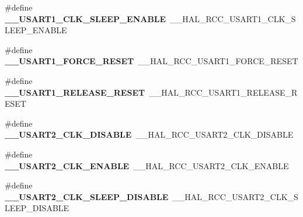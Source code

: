 \begin{DoxyCompactItemize}
\item 
\#define {\bfseries \+\_\+\+\_\+\+U\+S\+A\+R\+T1\+\_\+\+C\+L\+K\+\_\+\+S\+L\+E\+E\+P\+\_\+\+E\+N\+A\+B\+LE}~\+\_\+\+\_\+\+H\+A\+L\+\_\+\+R\+C\+C\+\_\+\+U\+S\+A\+R\+T1\+\_\+\+C\+L\+K\+\_\+\+S\+L\+E\+E\+P\+\_\+\+E\+N\+A\+B\+LE\hypertarget{group___h_a_l___r_c_c___aliased_ga6378b19a4a228da0e399b703b018f10c}{}\label{group___h_a_l___r_c_c___aliased_ga6378b19a4a228da0e399b703b018f10c}

\item 
\#define {\bfseries \+\_\+\+\_\+\+U\+S\+A\+R\+T1\+\_\+\+F\+O\+R\+C\+E\+\_\+\+R\+E\+S\+ET}~\+\_\+\+\_\+\+H\+A\+L\+\_\+\+R\+C\+C\+\_\+\+U\+S\+A\+R\+T1\+\_\+\+F\+O\+R\+C\+E\+\_\+\+R\+E\+S\+ET\hypertarget{group___h_a_l___r_c_c___aliased_gaf29da865725f4aa165fa9f551c40025e}{}\label{group___h_a_l___r_c_c___aliased_gaf29da865725f4aa165fa9f551c40025e}

\item 
\#define {\bfseries \+\_\+\+\_\+\+U\+S\+A\+R\+T1\+\_\+\+R\+E\+L\+E\+A\+S\+E\+\_\+\+R\+E\+S\+ET}~\+\_\+\+\_\+\+H\+A\+L\+\_\+\+R\+C\+C\+\_\+\+U\+S\+A\+R\+T1\+\_\+\+R\+E\+L\+E\+A\+S\+E\+\_\+\+R\+E\+S\+ET\hypertarget{group___h_a_l___r_c_c___aliased_ga705c0a674be8a0f70f013a31f7f2ee1c}{}\label{group___h_a_l___r_c_c___aliased_ga705c0a674be8a0f70f013a31f7f2ee1c}

\item 
\#define {\bfseries \+\_\+\+\_\+\+U\+S\+A\+R\+T2\+\_\+\+C\+L\+K\+\_\+\+D\+I\+S\+A\+B\+LE}~\+\_\+\+\_\+\+H\+A\+L\+\_\+\+R\+C\+C\+\_\+\+U\+S\+A\+R\+T2\+\_\+\+C\+L\+K\+\_\+\+D\+I\+S\+A\+B\+LE\hypertarget{group___h_a_l___r_c_c___aliased_gad87c7e24f846f645280bcab507705301}{}\label{group___h_a_l___r_c_c___aliased_gad87c7e24f846f645280bcab507705301}

\item 
\#define {\bfseries \+\_\+\+\_\+\+U\+S\+A\+R\+T2\+\_\+\+C\+L\+K\+\_\+\+E\+N\+A\+B\+LE}~\+\_\+\+\_\+\+H\+A\+L\+\_\+\+R\+C\+C\+\_\+\+U\+S\+A\+R\+T2\+\_\+\+C\+L\+K\+\_\+\+E\+N\+A\+B\+LE\hypertarget{group___h_a_l___r_c_c___aliased_ga8d6e2f7f87edd62b54140152a8f662c4}{}\label{group___h_a_l___r_c_c___aliased_ga8d6e2f7f87edd62b54140152a8f662c4}

\item 
\#define {\bfseries \+\_\+\+\_\+\+U\+S\+A\+R\+T2\+\_\+\+C\+L\+K\+\_\+\+S\+L\+E\+E\+P\+\_\+\+D\+I\+S\+A\+B\+LE}~\+\_\+\+\_\+\+H\+A\+L\+\_\+\+R\+C\+C\+\_\+\+U\+S\+A\+R\+T2\+\_\+\+C\+L\+K\+\_\+\+S\+L\+E\+E\+P\+\_\+\+D\+I\+S\+A\+B\+LE\hypertarget{group___h_a_l___r_c_c___aliased_ga7996fe6f4f857778c4acbd62a106bdce}{}\label{group___h_a_l___r_c_c___aliased_ga7996fe6f4f857778c4acbd62a106bdce}


\end{DoxyCompactItemize}
